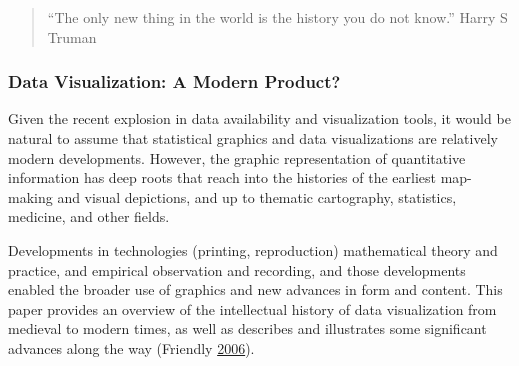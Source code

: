 \documentclass[]{book}
\begin{document}
\begin{quote}
``The only new thing in the world is the history you do not know.'' Harry S Truman
\end{quote}

\hypertarget{data-visualization-a-modern-product}{%
\subsubsection{Data Visualization: A Modern Product?}\label{data-visualization-a-modern-product}}

Given the recent explosion in data availability and visualization tools, it would be natural to assume that statistical graphics and data visualizations are relatively modern developments. However, the graphic representation of quantitative information has deep roots that reach into the histories of the earliest map-making and visual depictions, and up to thematic cartography, statistics, medicine, and other fields.

Developments in technologies (printing, reproduction) mathematical theory and practice, and empirical observation and recording, and those developments enabled the broader use of graphics and new advances in form and content. This paper provides an overview of the intellectual history of data visualization from medieval to modern times, as well as describes and illustrates some significant advances along the way (Friendly \protect\hyperlink{ref-data_viz_history}{2006}).
\end{document}
